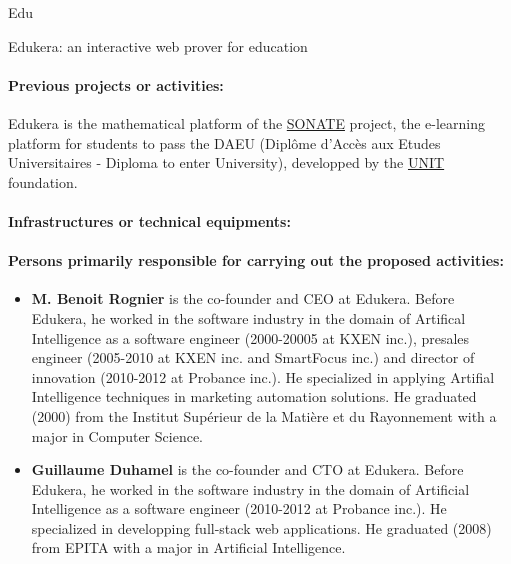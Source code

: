 \begin{sitedescription}{Edu}
\begin{compactitem}
    \item Edukera: an interactive web prover for education
\end{compactitem}

\paragraph*{Previous projects or activities:}


\begin{compactitem}
\item Edukera is the mathematical platform of the \hyperlink{https://daeu-sonate.fr/}{SONATE} project, the e-learning platform for
students to pass the DAEU (Diplôme d'Accès aux Etudes Universitaires - Diploma to enter University), developped by the \hyperlink{http://www.unit.eu/}{UNIT} foundation.
\end{compactitem}

\paragraph*{Infrastructures or technical equipments:}


\paragraph*{Persons primarily responsible for carrying out the proposed activities:}

\begin{itemize} %
\item{\bf M. Benoit Rognier} is the co-founder and CEO at Edukera.
Before Edukera, he worked in the software industry in the domain of Artifical Intelligence
as a software engineer (2000-20005 at KXEN inc.), presales engineer (2005-2010 at KXEN inc.
and SmartFocus inc.) and director of innovation (2010-2012 at Probance inc.).
He specialized in applying Artifial Intelligence techniques in marketing automation solutions.
He graduated (2000) from the Institut Supérieur de la Matière et du Rayonnement
with a major in Computer Science.

\item{\bf Guillaume Duhamel} is the co-founder and CTO at Edukera.
Before Edukera, he worked in the software industry in the domain of Artificial Intelligence
as a software engineer (2010-2012 at Probance inc.). He specialized in developping full-stack web applications.
He graduated (2008) from EPITA with a major in Artificial Intelligence.

\end{itemize}

\end{sitedescription}

